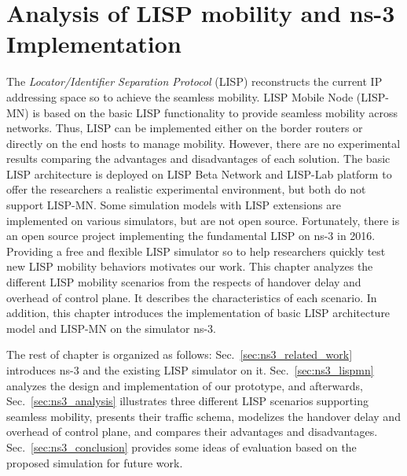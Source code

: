 
\chapter{Analysis of LISP mobility and ns-3 Implementation}
\label{cha:ns-3}

\ifpdf
    \graphicspath{{Chapter7/Pics/Raster/}{Chapter7/Pics/PDF/}{Chapter7/}}
\else
    \graphicspath{{Chapter7/Pics/Vector/}{Chapter7/}}
\fi

The \emph{Locator/Identifier Separation Protocol} (LISP) reconstructs the current IP addressing space so to achieve the seamless mobility. LISP Mobile Node (LISP-MN) is based on the basic LISP functionality to provide seamless mobility across networks. Thus, LISP can be implemented either on the border routers or directly on the end hosts to manage mobility. However, there are no experimental results comparing the advantages and disadvantages of each solution. The basic LISP architecture is deployed on LISP Beta Network and LISP-Lab platform to offer the researchers a realistic experimental environment, but both do not support LISP-MN. Some simulation models with LISP extensions are implemented on various simulators, but are not open source. Fortunately, there is an open source project implementing the fundamental LISP on ns-3 in 2016. Providing a free and flexible LISP simulator so to help researchers quickly test new LISP mobility behaviors motivates our work. This chapter analyzes the different LISP mobility scenarios from the respects of handover delay and overhead of control plane. It describes the characteristics of each scenario. In addition, this chapter introduces the implementation of basic LISP architecture model and LISP-MN on the simulator ns-3. %

The rest of chapter is organized as follows: Sec.~\ref{sec:ns3_related_work} introduces ns-3 and the existing LISP simulator on it. Sec.~\ref{sec:ns3_lispmn} analyzes the design and implementation of our prototype, and afterwards, Sec.~\ref{sec:ns3_analysis} illustrates three different LISP scenarios supporting seamless mobility, presents their traffic schema, modelizes the handover delay and overhead of control plane, and compares their advantages and disadvantages. %
Sec.~\ref{sec:ns3_conclusion} provides some ideas of evaluation based on the proposed simulation for future work.

